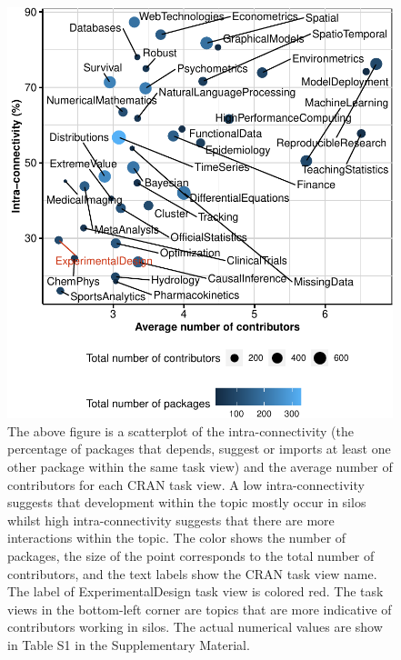 \documentclass{article}
\begin{document}
\begin{figure}[htbp]

{\centering \includegraphics{figures/ctv-summ-plot-1} 

}

\caption{The above figure is a scatterplot of the intra-connectivity (the percentage of packages that depends, suggest or imports at least one other package within the same task view) and the average number of contributors for each CRAN task view. A low intra-connectivity suggests that development within the topic mostly occur in silos whilst high  intra-connectivity suggests that there are more interactions within the topic. The color shows the number of packages, the size of the point corresponds to the total number of contributors, and the text labels show the CRAN task view name.  The label of ExperimentalDesign task view is colored red. The task views in the bottom-left corner are topics that are more indicative of contributors working in silos. The actual numerical values are show in Table S1 in the Supplementary Material.}\label{fig:ctv-summ-plot}
\end{figure}
\end{document}
